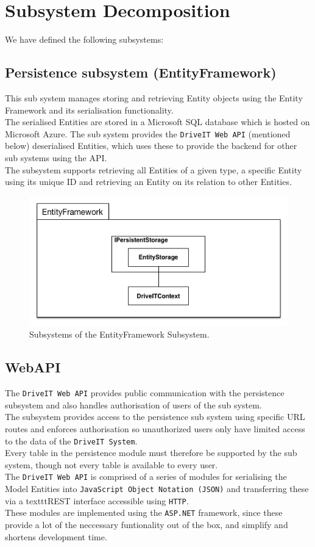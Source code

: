 \section{Subsystem Decomposition}
We have defined the following subsystems:
\subsection{Persistence subsystem (EntityFramework)} 
This sub system manages storing and retrieving Entity objects using the Entity Framework and its serialisation functionality.\\
The serialised Entities are stored in a Microsoft SQL database which is hosted on Microsoft Azure. The sub system provides the \texttt{DriveIT Web API} (mentioned below) deserialised Entities, which uses these to provide the backend for other sub systems using the API.\\
The subsystem supports retrieving all Entities of a given type, a specific Entity using its unique ID and retrieving an Entity on its relation to other Entities. 
\begin{figure}[H]
	\centering
	\includegraphics[scale=0.70]{Figures/EntityFrameworkSubsystemDecomposition}
	\caption{Subsystems of the EntityFramework Subsystem.}
\end{figure}

\subsection{WebAPI} 
The \texttt{DriveIT Web API} provides public communication with the persistence subsystem and also handles authorisation of users of the sub system.\\
The subsystem provides access to the persistence sub system using specific URL routes and enforces authorisation so unauthorized users only have limited access to the data of the \texttt{DriveIT System}.\\ 
Every table in the persistence module must therefore be supported by the sub system, though not every table is available to every user.\\
The \texttt{DriveIT Web API} is comprised of a series of modules for serialising the Model Entities into \texttt{JavaScript Object Notation (JSON)} and transferring these via a texttt{REST} interface accessible using \texttt{HTTP}. \\
These modules are implemented using the \texttt{ASP.NET} framework, since these provide a lot of the neccessary funtionality out of the box, and simplify and shortens development time.

